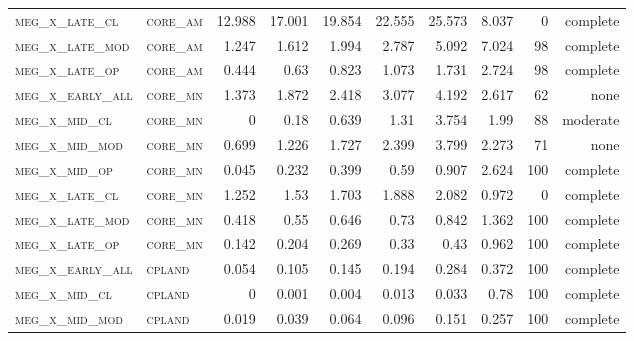 \begin{landscape}
\begin{center}
\begin{footnotesize}
\begin{longtable}{llrrrrr|rrr}
\textsc{meg\_x\_late\_cl  } & \textsc{core\_am  }    & 12.988   & 17.001   & 19.854   & 22.555   & 25.573    & 8.037         & 0             & complete            \\
\textsc{meg\_x\_late\_mod } & \textsc{core\_am  }    & 1.247    & 1.612    & 1.994    & 2.787    & 5.092     & 7.024         & 98            & complete              \\
\textsc{meg\_x\_late\_op  } & \textsc{core\_am  }    & 0.444    & 0.63     & 0.823    & 1.073    & 1.731     & 2.724         & 98            & complete              \\
\textsc{meg\_x\_early\_all} & \textsc{core\_mn  }    & 1.373    & 1.872    & 2.418    & 3.077    & 4.192     & 2.617         & 62            & none              \\
\textsc{meg\_x\_mid\_cl   } & \textsc{core\_mn  }    & 0        & 0.18     & 0.639    & 1.31     & 3.754     & 1.99          & 88            & moderate              \\
\textsc{meg\_x\_mid\_mod  } & \textsc{core\_mn  }    & 0.699    & 1.226    & 1.727    & 2.399    & 3.799     & 2.273         & 71            & none              \\
\textsc{meg\_x\_mid\_op   } & \textsc{core\_mn  }    & 0.045    & 0.232    & 0.399    & 0.59     & 0.907     & 2.624         & 100           & complete             \\
\textsc{meg\_x\_late\_cl  } & \textsc{core\_mn  }    & 1.252    & 1.53     & 1.703    & 1.888    & 2.082     & 0.972         & 0             & complete            \\
\textsc{meg\_x\_late\_mod } & \textsc{core\_mn  }    & 0.418    & 0.55     & 0.646    & 0.73     & 0.842     & 1.362         & 100           & complete             \\
\textsc{meg\_x\_late\_op  } & \textsc{core\_mn  }    & 0.142    & 0.204    & 0.269    & 0.33     & 0.43      & 0.962         & 100           & complete             \\
\textsc{meg\_x\_early\_all} & \textsc{cpland    }    & 0.054    & 0.105    & 0.145    & 0.194    & 0.284     & 0.372         & 100           & complete             \\
\textsc{meg\_x\_mid\_cl   } & \textsc{cpland    }    & 0        & 0.001    & 0.004    & 0.013    & 0.033     & 0.78          & 100           & complete             \\
\textsc{meg\_x\_mid\_mod  } & \textsc{cpland    }    & 0.019    & 0.039    & 0.064    & 0.096    & 0.151     & 0.257         & 100           & complete             \\

\end{longtable}
\end{footnotesize}
\end{center}
\end{landscape}
